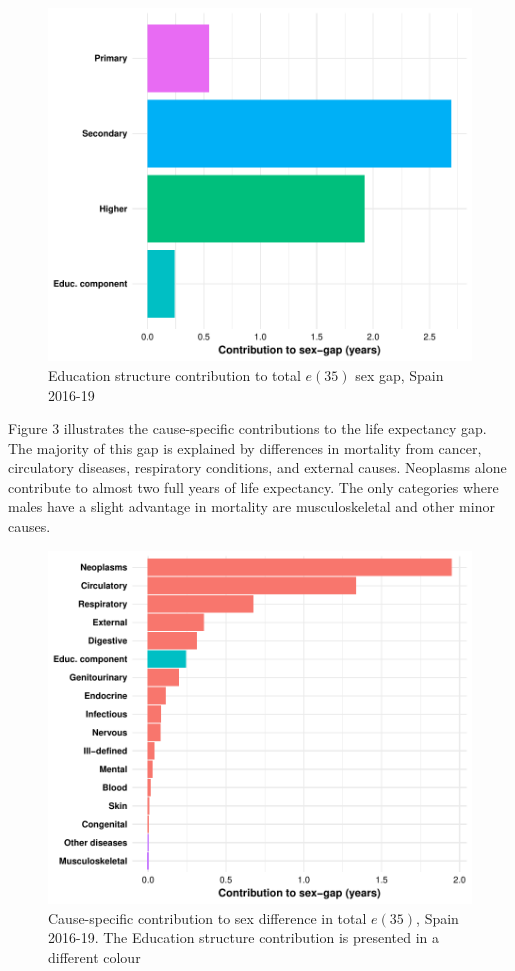 \documentclass[12pt, sn-apa,pdflatex,letterpaper]{sn-jnl}
\begin{document}
\begin{figure}[ht!]
    \centering
    \includegraphics[width=.8\linewidth]{manuscript/fig2.pdf}
    \caption{Education structure contribution to total $e(35)$ sex gap, Spain 2016-19}
    \label{fig:enter-label}
\end{figure}

Figure 3 illustrates the cause-specific contributions to the life expectancy gap. The majority of this gap is explained by differences in mortality from cancer, circulatory diseases, respiratory conditions, and external causes. Neoplasms alone contribute to almost two full years of life expectancy. The only categories where males have a slight advantage in mortality are musculoskeletal and other minor causes. 

\begin{figure}[ht!]
    \centering
    \includegraphics[width=.8\linewidth]{manuscript/fig3.pdf}
    \caption{Cause-specific contribution to sex difference in total $e(35)$, Spain 2016-19. The Education structure contribution is presented in a different colour}
    \label{fig:enter-label}
\end{figure}
\end{document}

